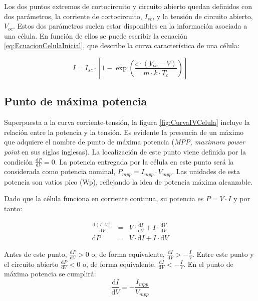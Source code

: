 Los dos puntos extremos de cortocircuito y circuito abierto quedan
definidos con dos parámetros, la corriente de cortocircuito, $I_{sc}$,
y la tensión de circuito abierto, $V_{oc}$. Estos dos parámetros
suelen estar disponibles en la información asociada a una célula.
En función de ellos se puede escribir la ecuación \ref{eq:EcuacionCelulaInicial},
que describe la curva característica de una célula:

\begin{equation}
I=I_{sc}\cdot\left[1-\exp\left(\frac{e\cdot(V_{oc}-V)}{m\cdot k\cdot T_{c}}\right)\right]\label{eq:EcuacionCelulaInicial}\end{equation}


\subsection{Punto de máxima potencia}

Superpuesta a la curva corriente-tensión, la figura \ref{fig:CurvaIVCelula}
incluye la relación entre la potencia y la tensión. Es evidente la
presencia de un máximo que adquiere el nombre de punto de máxima potencia
(\emph{MPP, maximum power point }en sus siglas inglesas). La localización
de este punto viene definida por la condición $\frac{\mathrm{d}P}{\mathrm{d}V}=0$.
La potencia entregada por la célula en este punto será la considerada
como potencia nominal, $P_{mpp}=I_{mpp}\cdot V_{mpp}$.
Las unidades de esta potencia son vatios pico (Wp), reflejando la
idea de potencia máxima alcanzable.

Dado que la célula funciona en corriente continua, su potencia es
$P=V\cdot I$ y por tanto:

\begin{eqnarray}
\frac{\mathrm{d}(I\cdot V)}{\mathrm{d}V} & = & V\cdot\frac{\mathrm{d}I}{\mathrm{d}V}+I\cdot\frac{\mathrm{d}V}{\mathrm{d}V}\nonumber \\
\mathrm{d}P & = & V\cdot\mathrm{d}I+I\cdot\mathrm{d}V\end{eqnarray}


Antes de este punto, $\frac{\mathrm{d}P}{\mathrm{d}V}>0$ o, de
forma equivalente, $\frac{\mathrm{d}I}{\mathrm{d}V}>-\frac{I}{V}$.
Entre este punto y el circuito abierto $\frac{\mathrm{d}P}{\mathrm{d}V}<0$
o, de forma equivalente, $\frac{\mathrm{d}I}{\mathrm{d}V}<-\frac{I}{V}$.
En el punto de máxima potencia se cumplirá:\begin{equation}
\frac{\mathrm{d}I}{\mathrm{d}V}=-\frac{I_{mpp}}{V_{mpp}}\label{eq:MPP_derivada}\end{equation}




